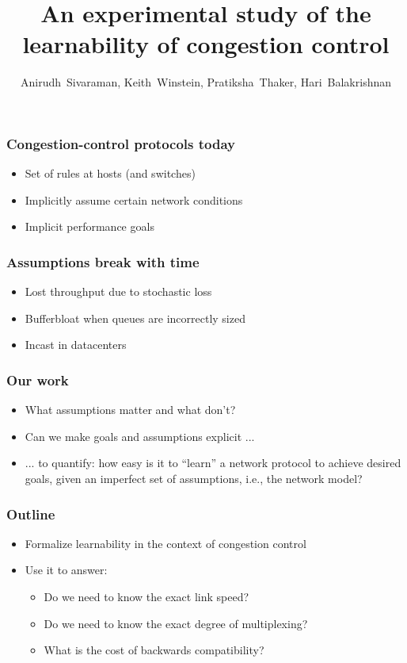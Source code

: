 \documentclass[svgnames]{beamer}
\title{An experimental study of the learnability of congestion control}
\author{Anirudh~Sivaraman, Keith~Winstein, Pratiksha~Thaker, Hari~Balakrishnan}
\institute{MIT CSAIL\vspace{\baselineskip}}
\begin{document}
\begin{frame}

\titlepage

\end{frame}

\begin{Large}
\begin{frame}
\frametitle{Congestion-control protocols today}
\begin{itemize}
\item<2-> Set of rules at hosts (and switches)
\item<3-> Implicitly assume certain network conditions
\item<4-> Implicit performance goals
\end{itemize}
\end{frame}

\begin{frame}
\frametitle{Assumptions break with time}
\begin{itemize}
\item Lost throughput due to stochastic loss 
\item Bufferbloat when queues are incorrectly sized
\item Incast in datacenters
\end{itemize}
\end{frame}

\begin{frame}
\frametitle{Our work}
\begin{itemize}
\item<1-> What assumptions matter and what don't?
\item<2-> Can we make goals and assumptions explicit ...
\item<3-> ... to quantify: how easy is it to “learn” a network protocol to achieve desired goals, given
an imperfect set of assumptions, i.e., the network model?
\end{itemize}
\end{frame}

\begin{frame}
\frametitle{Outline}
\begin{itemize}
\item Formalize learnability in the context of congestion control
\item Use it to answer:
\begin{itemize}
\item Do we need to know the exact link speed?
\item Do we need to know the exact degree of multiplexing?
\item What is the cost of backwards compatibility?
\end{itemize}
\end{itemize}
\end{frame}


\end{Large}
\end{document}
